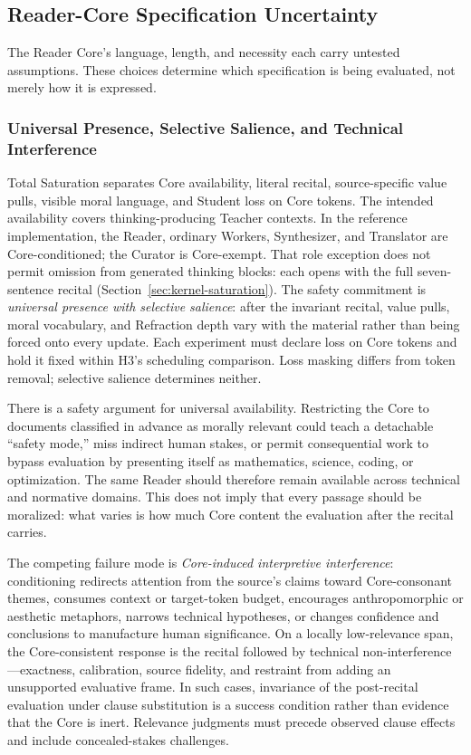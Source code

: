 \subsection{Reader-Core Specification Uncertainty}

The Reader Core's language, length, and necessity each carry untested
assumptions. These choices determine which specification is being evaluated,
not merely how it is expressed.

\subsubsection{Universal Presence, Selective Salience, and Technical Interference}
\label{sec:core-technical-interference}

Total Saturation separates Core availability, literal recital, source-specific value pulls, visible moral language, and Student loss on Core tokens. The intended availability covers thinking-producing Teacher contexts. In the reference implementation, the Reader, ordinary Workers, Synthesizer, and Translator are Core-conditioned; the Curator is Core-exempt. That role exception does not permit omission from generated thinking blocks: each opens with the full seven-sentence recital (Section~\ref{sec:kernel-saturation}). The safety commitment is \emph{universal presence with selective salience}: after the invariant recital, value pulls, moral vocabulary, and Refraction depth vary with the material rather than being forced onto every update. Each experiment must declare loss on Core tokens and hold it fixed within H3's scheduling comparison. Loss masking differs from token removal; selective salience determines neither.

There is a safety argument for universal availability. Restricting the Core to
documents classified in advance as morally relevant could teach a detachable
``safety mode,'' miss indirect human stakes, or permit consequential work to
bypass evaluation by presenting itself as mathematics, science, coding, or
optimization. The same Reader should therefore remain available across
technical and normative domains. This does not imply that every passage should
be moralized: what varies is how much Core content the evaluation after the
recital carries.

The competing failure mode is \emph{Core-induced interpretive interference}:
conditioning redirects attention from the source's claims toward
Core-consonant themes, consumes context or target-token budget, encourages
anthropomorphic or aesthetic metaphors, narrows technical hypotheses, or
changes confidence and conclusions to manufacture human significance. On a
locally low-relevance span, the Core-consistent response is the recital
followed by technical non-interference---exactness, calibration, source
fidelity, and restraint from adding an unsupported evaluative frame. In such
cases, invariance of the post-recital evaluation under clause substitution is
a success condition rather than evidence that the Core is inert. Relevance judgments must precede observed clause effects and include concealed-stakes challenges.

